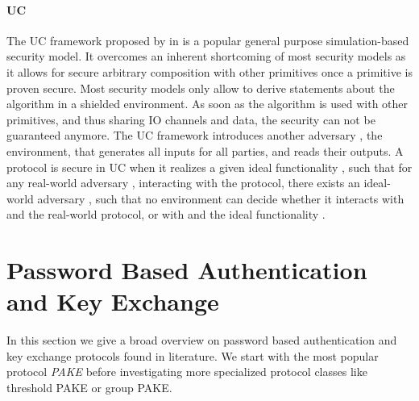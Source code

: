 \paragraph{\acl{UC}}
The \ac{UC} framework proposed by \citeauthor{Canetti2001a} \cite{Canetti2001a} in \citeyear{Canetti2001a} is a popular general purpose simulation-based security model.
It overcomes an inherent shortcoming of most security models as it allows for secure arbitrary composition with other primitives once a primitive is proven secure.
Most security models only allow to derive statements about the algorithm in a shielded environment.
As soon as the algorithm is used with other primitives, and thus sharing \ac{IO} channels and data, the security can not be guaranteed anymore.
The \ac{UC} framework introduces another adversary \UCZ, the environment, that generates all inputs for all parties, and reads their outputs.
A protocol is secure in \ac{UC} when it realizes a given ideal functionality \UCF, such that for any real-world adversary \A, interacting with the protocol, there exists an ideal-world adversary \UCS, such that no environment \UCZ can decide whether it interacts with \A and the real-world protocol, or with \UCS and the ideal functionality \UCF.


\section{Password Based Authentication and Key Exchange}
In this section we give a broad overview on password based authentication and key exchange protocols found in literature.
We start with the most popular protocol \emph{\ac{PAKE}} before investigating more specialized protocol classes like threshold \ac{PAKE} or group \ac{PAKE}.

